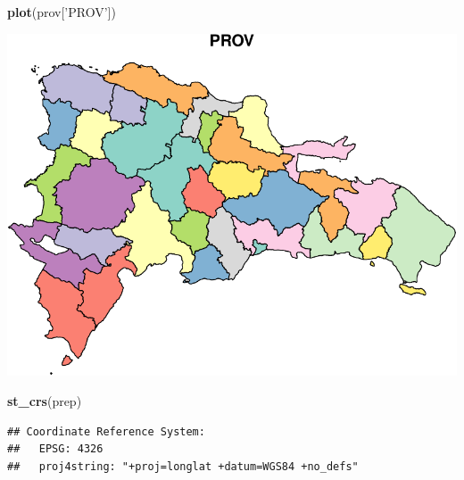 \documentclass[11pt,]{article}
\newenvironment{Shaded}{\begin{snugshade}}{\end{snugshade}}
\newcommand{\KeywordTok}[1]{\textcolor[rgb]{0.13,0.29,0.53}{\textbf{#1}}}
\newcommand{\DataTypeTok}[1]{\textcolor[rgb]{0.13,0.29,0.53}{#1}}
\newcommand{\DecValTok}[1]{\textcolor[rgb]{0.00,0.00,0.81}{#1}}
\newcommand{\StringTok}[1]{\textcolor[rgb]{0.31,0.60,0.02}{#1}}
\newcommand{\OperatorTok}[1]{\textcolor[rgb]{0.81,0.36,0.00}{\textbf{#1}}}
\newcommand{\NormalTok}[1]{#1}
\begin{document}
\begin{Shaded}
\begin{Highlighting}[]
\KeywordTok{plot}\NormalTok{(prov[}\StringTok{'PROV'}\NormalTok{])}
\end{Highlighting}
\end{Shaded}

\includegraphics{proyecto_files/figure-latex/unnamed-chunk-4-1.pdf}

\begin{Shaded}
\begin{Highlighting}[]
\KeywordTok{st_crs}\NormalTok{(prep)}
\end{Highlighting}
\end{Shaded}

\begin{verbatim}
## Coordinate Reference System:
##   EPSG: 4326 
##   proj4string: "+proj=longlat +datum=WGS84 +no_defs"
\end{verbatim}

\begin{Shaded}
\end{Shaded}
\end{document}
